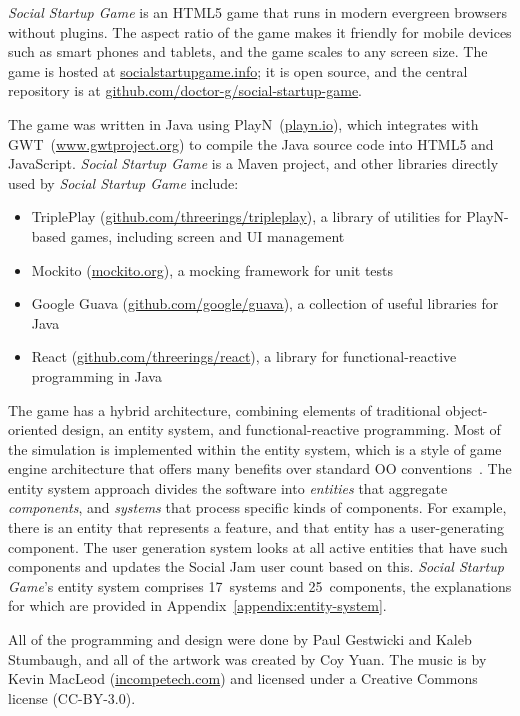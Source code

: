 \documentclass[letterpaper]{article}
\begin{document}
\textit{Social Startup Game} is an HTML5 game that runs
in modern evergreen browsers without plugins. The aspect
ratio of the game makes it friendly for mobile devices such as smart
phones and tablets, and the game scales to any screen size.  The game
is hosted at \url{socialstartupgame.info}; it is open source, and the
central repository is at
\url{github.com/doctor-g/social-startup-game}.

The game was written in Java using PlayN~(\url{playn.io}),
which integrates with GWT~(\url{www.gwtproject.org})
to compile the Java source code into
HTML5 and JavaScript. 
\textit{Social Startup Game} is a Maven project, and other
libraries directly 
used by \textit{Social Startup Game} include: 
\begin{itemize}
\item TriplePlay (\url{github.com/threerings/tripleplay}), 
 a library of utilities for PlayN-based games, including 
 screen and UI management
\item Mockito (\url{mockito.org}), a mocking framework for unit tests
\item Google Guava (\url{github.com/google/guava}), a collection
 of useful libraries for Java
\item React (\url{github.com/threerings/react}), a library for
 functional-reactive programming in Java
\end{itemize}

The game has a hybrid architecture, combining elements of traditional
object-oriented design, an entity system, and functional-reactive
programming.
Most of the simulation is implemented within the entity system,
which is a style of game engine architecture that offers many benefits over
standard OO conventions~\citep{Gestwicki2012}. The entity system
approach divides the software into \textit{entities} that
aggregate \textit{components}, and \textit{systems} that process 
specific kinds of components.
For example, there is an entity that represents a feature, and that
entity has a user-generating component. The user generation system
looks at all active entities that have such components and updates
the Social Jam user count based on this.
\textit{Social Startup Game}'s entity system comprises 17~systems
and 25~components, the explanations for which are provided
in Appendix~\ref{appendix:entity-system}.

All of the programming and design were done by Paul Gestwicki and
Kaleb Stumbaugh, and all of the artwork was created by Coy Yuan.  The
music is by Kevin MacLeod (\url{incompetech.com}) and licensed under a
Creative Commons license (CC-BY-3.0).
\end{document}
